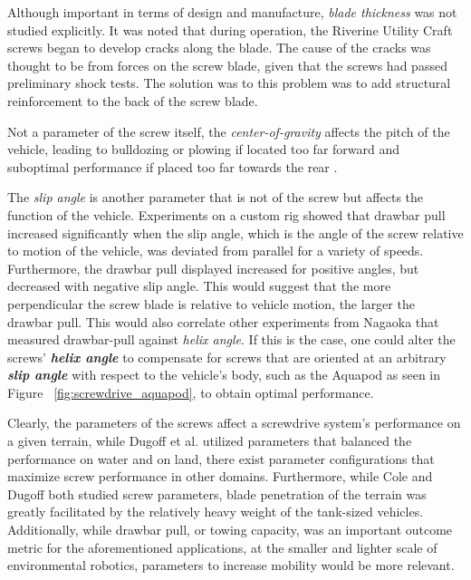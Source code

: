 Although important in terms of design and manufacture, \emph{blade thickness} was not studied explicitly. It was noted that during operation, the Riverine Utility Craft screws began to develop cracks along the blade. The cause of the cracks was thought to be from forces on the screw blade, given that the screws had passed preliminary shock tests. The solution was to this problem was to add structural reinforcement to the back of the screw blade. 

Not a parameter of the screw itself, the \emph{center-of-gravity} affects the pitch of the vehicle, leading to bulldozing or plowing if located too far forward and suboptimal performance if placed too far towards the rear \cite{Dugoff1967, Nagaoka2011}. 

The \emph{slip angle} is another parameter that is not of the screw but affects the function of the vehicle. Experiments on a custom rig showed that drawbar pull increased significantly when the slip angle, which is the angle of the screw relative to motion of the vehicle, was deviated from parallel for a variety of speeds. Furthermore, the drawbar pull displayed increased for positive angles, but decreased with negative slip angle. This would suggest that the more perpendicular the screw blade is relative to vehicle motion, the larger the drawbar pull. This would also correlate other experiments from Nagaoka \cite{Cole1961} that measured drawbar-pull against \emph{helix angle}. If this is the case, one could alter the screws' \textbf{\emph{helix angle}} to compensate for screws that are oriented at an arbitrary \textbf{\emph{slip angle}} with respect to the vehicle's body, such as the Aquapod as seen in Figure ~\ref{fig:screwdrive_aquapod}, to obtain optimal performance.

Clearly, the parameters of the screws affect a screwdrive system's performance on a given terrain, while Dugoff et al. \cite{Dugoff1967} utilized parameters that balanced the performance on water and on land, there exist parameter configurations that maximize screw performance in other domains. Furthermore, while Cole \cite{Cole1961} and Dugoff \cite{Dugoff1967} both studied screw parameters, blade penetration of the terrain was greatly facilitated by the relatively heavy weight of the tank-sized vehicles. Additionally, while drawbar pull, or towing capacity, was an important outcome metric for the aforementioned applications, at the smaller and lighter scale of environmental robotics, parameters to increase mobility would be more relevant. 

